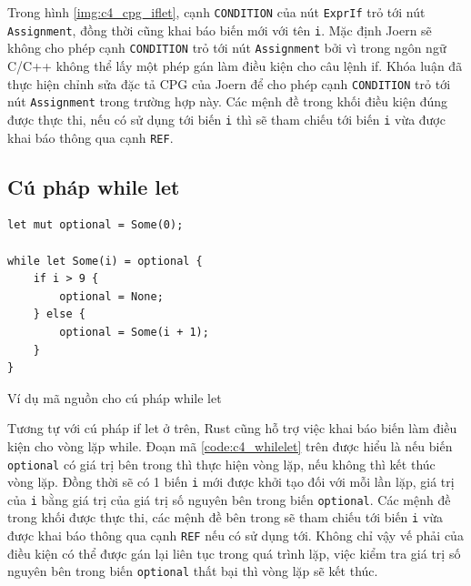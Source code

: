 Trong hình \ref{img:c4_cpg_iflet}, cạnh \texttt{CONDITION} của nút \texttt{ExprIf} trỏ tới nút \texttt{Assignment}, đồng thời cũng khai báo biến mới với tên \texttt{i}.
Mặc định Joern sẽ không cho phép cạnh \texttt{CONDITION} trỏ tới nút \texttt{Assignment} bởi vì trong ngôn ngữ C/C++ không thể lấy một phép gán làm điều kiện cho câu lệnh if.
Khóa luận đã thực hiện chỉnh sửa đặc tả CPG của Joern để cho phép cạnh \texttt{CONDITION} trỏ tới nút \texttt{Assignment} trong trường hợp này.
Các mệnh đề trong khối điều kiện đúng được thực thi, nếu có sử dụng tới biến \texttt{i} thì sẽ tham chiếu tới biến \texttt{i} vừa được khai báo thông qua cạnh \texttt{REF}.

\subsection{Cú pháp while let}




\begin{listing}[H]
\begin{verbatim}
let mut optional = Some(0);

while let Some(i) = optional {
    if i > 9 {
        optional = None;
    } else {
        optional = Some(i + 1);
    }
}
\end{verbatim}
\caption{Ví dụ mã nguồn cho cú pháp while let}
\label{code:c4_whilelet}
\end{listing}

Tương tự với cú pháp if let ở trên, Rust cũng hỗ trợ việc khai báo biến làm điều kiện cho vòng lặp while.
Đoạn mã \ref{code:c4_whilelet} trên được hiểu là nếu biến \texttt{optional} có giá trị bên trong thì thực hiện vòng lặp, nếu không thì kết thúc vòng lặp.
Đồng thời sẽ có 1 biến \texttt{i} mới được khởi tạo đối với mỗi lần lặp, giá trị của \texttt{i} bằng giá trị của giá trị số nguyên bên trong biến \texttt{optional}.
Các mệnh đề trong khối được thực thi, các mệnh đề bên trong sẽ tham chiếu tới biến \texttt{i} vừa được khai báo thông qua cạnh \texttt{REF} nếu có sử dụng tới.
Không chỉ vậy vế phải của điều kiện có thể được gán lại liên tục trong quá trình lặp, việc kiểm tra giá trị số nguyên bên trong biến \texttt{optional} thất bại thì vòng lặp sẽ kết thúc.

